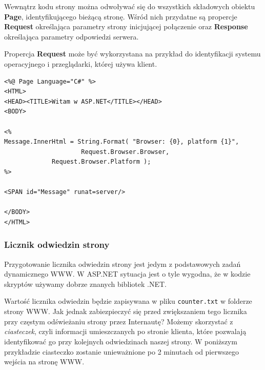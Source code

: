 Wewnątrz kodu strony można odwoływać się do wszystkich składowych obiektu {\bf Page}, identyfikującego
bieżącą stronę. Wśród nich przydatne są propercje {\bf Request} określająca parametry strony inicjującej
połączenie oraz {\bf Response} określająca parametry odpowiedzi serwera.

Propercja {\bf Request} może być wykorzystana na przykład do identyfikacji systemu operacyjnego
i przeglądarki, której używa klient.

\begin{scriptsize}
\begin{verbatim}
<%@ Page Language="C#" %>
<HTML>
<HEAD><TITLE>Witam w ASP.NET</TITLE></HEAD>
<BODY>

<%
Message.InnerHtml = String.Format( "Browser: {0}, platform {1}", 
                     Request.Browser.Browser, 
		     Request.Browser.Platform );
%>

<SPAN id="Message" runat=server/>

</BODY>
</HTML>
\end{verbatim}
\end{scriptsize}

\subsubsection{Licznik odwiedzin strony}

Przygotowanie licznika odwiedzin strony jest jedym z podstawowych zadań dynamicznego WWW. W ASP.NET sytuacja jest
o tyle wygodna, że w kodzie skryptów używamy dobrze znanych bibliotek .NET.

Wartość licznika odwiedzin będzie zapisywana w pliku {\tt counter.txt} w folderze strony WWW.
Jak jednak zabiezpieczyć się przed zwiększaniem tego licznika przy częstym odświeżaniu strony
przez Internautę? Możemy skorzystać z {\em ciasteczek}, czyli informacji umieszczanych po stronie
klienta, które pozwalają identyfikować go przy kolejnych odwiedzinach naszej strony. W poniższym
przykładzie ciasteczko zostanie unieważnione po 2 minutach od pierwszego wejścia na stronę WWW.

